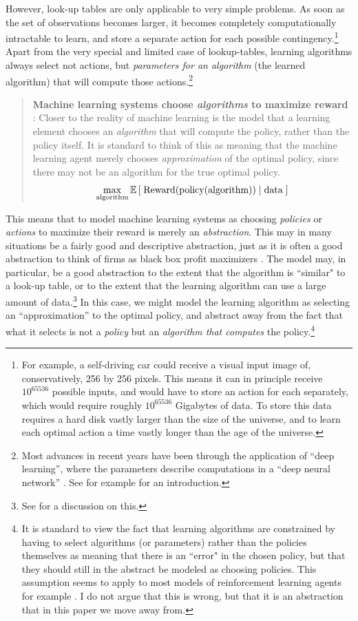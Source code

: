 However, look-up tables are only applicable to very simple problems. As soon as the set of observations becomes larger, it becomes completely computationally intractable to learn, and store a separate action for each possible contingency.\footnote{For example, a self-driving car could receive a visual input image of, conservatively, 256 by 256 pixels. This means it can in principle receive $10^{65536}$ possible inputs, and would have to store an action for each separately, which would require roughly $10^{65536}$ Gigabytes of data. To store this data requires a hard disk vastly larger than the size of the universe, and to learn each optimal action a time vastly longer than the age of the universe.} Apart from the very special and limited case of lookup-tables, learning algorithms always select not actions, but \textit{parameters for an algorithm} (the learned algorithm) that will compute those actions.\footnote{Most advances in recent years have been through the application of “deep learning”, where the parameters describe computations in a “deep neural network” \citep{LeCun2015}. See for example \citep{Goodfellow2016} for an introduction.}

\begin{quote}
	\textbf{Machine learning systems choose \textit{algorithms} to maximize reward} : Closer to the reality of machine learning is the model that a learning element chooses an \textit{algorithm} that will compute the policy, rather than the policy itself. It is standard to think of this as meaning that the machine learning agent merely chooses \textit{approximation} of the optimal policy, since there may not be an algorithm for the true optimal policy.
	$$\max\limits_{\text{algorithm}} \mathbb E\left[\text{\;Reward(policy(algorithm))}\;|\;\text{data}\;\right]$$
\end{quote}


This means that to model machine learning systems as choosing \textit{policies} or \textit{actions} to maximize their reward is merely an \textit{abstraction}. This may in many situations be a fairly good and descriptive abstraction, just as it is often a good abstraction to think of firms as black box profit maximizers \citep{Hart1989}. The model may, in particular, be a good abstraction to the extent that the algorithm is ``similar" to a look-up table, or to the extent that the learning algorithm can use a large amount of data.\footnote {See \citep{Hubinger2019} for a discussion on this.} In this case, we might model the learning algorithm as selecting an “approximation” to the optimal policy, and abstract away from the fact that what it selects is not a \textit{policy} but an \textit{algorithm that computes} the policy.\footnote{It is standard to view the fact that learning algorithms are constrained by having to select algorithms (or parameters) rather than the policies themselves as meaning that there is an ``error" in the chosen policy, but that they should still in the abstract be modeled as choosing policies. This assumption seems to apply to most models of reinforcement learning agents for example \citep{Sutton1998,Kaelbling1996, Sxepesvari2010}. I do not argue that this is wrong, but that it is an abstraction that in this paper we move away from. }

